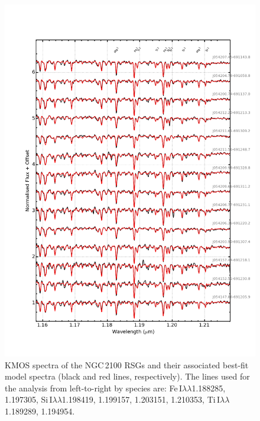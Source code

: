 \documentclass[useAMS,usenatbib]{mn2e}
\begin{document}
\begin{figure}
 \begin{center}
\includegraphics[width=16cm]{NGC2100-model-fits}
\caption{KMOS spectra of the NGC\,2100 RSGs and their associated best-fit model spectra
(black and red lines, respectively).
The lines used for the analysis from left-to-right by species are:
Fe\,I$\lambda\lambda$1.188285,
1.197305,
Si\,I$\lambda\lambda$1.198419,
1.199157,
1.203151,
1.210353,
Ti\,I$\lambda\lambda$1.189289,
1.194954.
         }
\label{fig:model_fits}
\end{center}
\end{figure}




\end{document}

